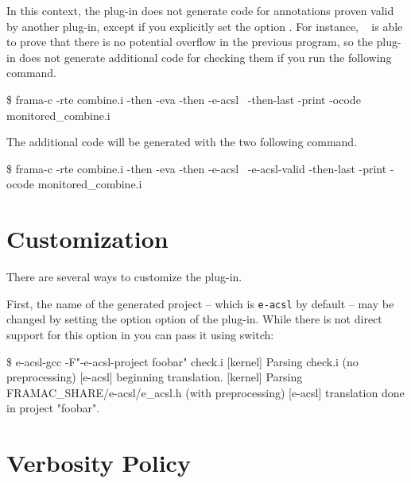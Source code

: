 In this context, the \eacsl plug-in does not generate code for annotations
proven valid by another plug-in, except if you explicitly set the option
. For instance, \Eva~\cite{eva} is able to
prove that there is no potential overflow in the previous program, so the \eacsl
plug-in does not generate additional code for checking them if you run the
following command.
\begin{frama-c-commands}
\$ frama-c -rte combine.i -then -eva -then -e-acsl \
  -then-last -print -ocode monitored_combine.i
\end{frama-c-commands}
The additional code will be generated with the two following command.
\begin{frama-c-commands}
\$ frama-c -rte combine.i -then -eva -then -e-acsl \
  -e-acsl-valid -then-last -print -ocode monitored_combine.i
\end{frama-c-commands}

\section{Customization} %
\label{sec:custom}

There are several ways to customize the \eacsl plug-in.

First, the name of the generated project -- which is \texttt{e-acsl} by default
-- may be changed by setting the option  option of the
\eacsl plug-in. While there is not direct support for this option in \eacslgcc
you can pass it using \shortopt{F} switch:


\begin{logs}
\$ e-acsl-gcc -F"-e-acsl-project foobar" check.i
[kernel] Parsing check.i (no preprocessing)
[e-acsl] beginning translation.
[kernel] Parsing FRAMAC_SHARE/e-acsl/e_acsl.h (with preprocessing)
[e-acsl] translation done in project "foobar".
\end{logs}

\section{Verbosity Policy} %
\label{sec:verbose}

